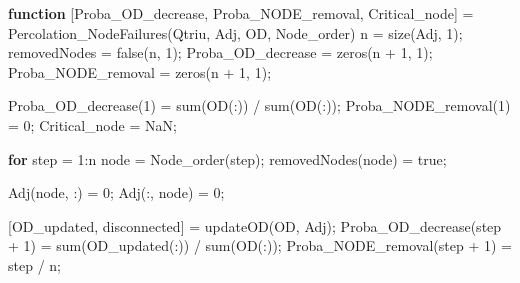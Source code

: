 \documentclass[
  letterpaper,
  DIV=11,
  numbers=noendperiod]{scrartcl}
\newenvironment{Shaded}{\begin{snugshade}}{\end{snugshade}}
\newcommand{\FloatTok}[1]{\textcolor[rgb]{0.68,0.00,0.00}{#1}}
\newcommand{\KeywordTok}[1]{\textcolor[rgb]{0.00,0.23,0.31}{\textbf{#1}}}
\newcommand{\NormalTok}[1]{\textcolor[rgb]{0.00,0.23,0.31}{#1}}
\newcommand{\OperatorTok}[1]{\textcolor[rgb]{0.37,0.37,0.37}{#1}}
\newcommand{\VariableTok}[1]{\textcolor[rgb]{0.07,0.07,0.07}{#1}}
\begin{document}
\begin{Shaded}
\begin{Highlighting}[]
\KeywordTok{function}\NormalTok{ [}\VariableTok{Proba\_OD\_decrease}\OperatorTok{,} \VariableTok{Proba\_NODE\_removal}\OperatorTok{,} \VariableTok{Critical\_node}\NormalTok{] }\OperatorTok{=} \VariableTok{Percolation\_NodeFailures}\NormalTok{(}\VariableTok{Qtriu}\OperatorTok{,} \VariableTok{Adj}\OperatorTok{,} \VariableTok{OD}\OperatorTok{,} \VariableTok{Node\_order}\NormalTok{)}
  \VariableTok{n} \OperatorTok{=} \VariableTok{size}\NormalTok{(}\VariableTok{Adj}\OperatorTok{,} \FloatTok{1}\NormalTok{)}\OperatorTok{;}
  \VariableTok{removedNodes} \OperatorTok{=} \VariableTok{false}\NormalTok{(}\VariableTok{n}\OperatorTok{,} \FloatTok{1}\NormalTok{)}\OperatorTok{;}
  \VariableTok{Proba\_OD\_decrease} \OperatorTok{=} \VariableTok{zeros}\NormalTok{(}\VariableTok{n} \OperatorTok{+} \FloatTok{1}\OperatorTok{,} \FloatTok{1}\NormalTok{)}\OperatorTok{;}
  \VariableTok{Proba\_NODE\_removal} \OperatorTok{=} \VariableTok{zeros}\NormalTok{(}\VariableTok{n} \OperatorTok{+} \FloatTok{1}\OperatorTok{,} \FloatTok{1}\NormalTok{)}\OperatorTok{;}

  \VariableTok{Proba\_OD\_decrease}\NormalTok{(}\FloatTok{1}\NormalTok{) }\OperatorTok{=} \VariableTok{sum}\NormalTok{(}\VariableTok{OD}\NormalTok{(}\OperatorTok{:}\NormalTok{)) }\OperatorTok{/} \VariableTok{sum}\NormalTok{(}\VariableTok{OD}\NormalTok{(}\OperatorTok{:}\NormalTok{))}\OperatorTok{;}
  \VariableTok{Proba\_NODE\_removal}\NormalTok{(}\FloatTok{1}\NormalTok{) }\OperatorTok{=} \FloatTok{0}\OperatorTok{;}
  \VariableTok{Critical\_node} \OperatorTok{=} \VariableTok{NaN}\OperatorTok{;}

  \KeywordTok{for} \VariableTok{step} \OperatorTok{=} \FloatTok{1}\OperatorTok{:}\VariableTok{n}
      \VariableTok{node} \OperatorTok{=} \VariableTok{Node\_order}\NormalTok{(}\VariableTok{step}\NormalTok{)}\OperatorTok{;}
      \VariableTok{removedNodes}\NormalTok{(}\VariableTok{node}\NormalTok{) }\OperatorTok{=} \VariableTok{true}\OperatorTok{;}

      \VariableTok{Adj}\NormalTok{(}\VariableTok{node}\OperatorTok{,} \OperatorTok{:}\NormalTok{) }\OperatorTok{=} \FloatTok{0}\OperatorTok{;}
      \VariableTok{Adj}\NormalTok{(}\OperatorTok{:,} \VariableTok{node}\NormalTok{) }\OperatorTok{=} \FloatTok{0}\OperatorTok{;}

\NormalTok{      [}\VariableTok{OD\_updated}\OperatorTok{,} \VariableTok{disconnected}\NormalTok{] }\OperatorTok{=} \VariableTok{updateOD}\NormalTok{(}\VariableTok{OD}\OperatorTok{,} \VariableTok{Adj}\NormalTok{)}\OperatorTok{;}
      \VariableTok{Proba\_OD\_decrease}\NormalTok{(}\VariableTok{step} \OperatorTok{+} \FloatTok{1}\NormalTok{) }\OperatorTok{=} \VariableTok{sum}\NormalTok{(}\VariableTok{OD\_updated}\NormalTok{(}\OperatorTok{:}\NormalTok{)) }\OperatorTok{/} \VariableTok{sum}\NormalTok{(}\VariableTok{OD}\NormalTok{(}\OperatorTok{:}\NormalTok{))}\OperatorTok{;}
      \VariableTok{Proba\_NODE\_removal}\NormalTok{(}\VariableTok{step} \OperatorTok{+} \FloatTok{1}\NormalTok{) }\OperatorTok{=} \VariableTok{step} \OperatorTok{/} \VariableTok{n}\OperatorTok{;}


\end{Highlighting}
\end{Shaded}
\end{document}
